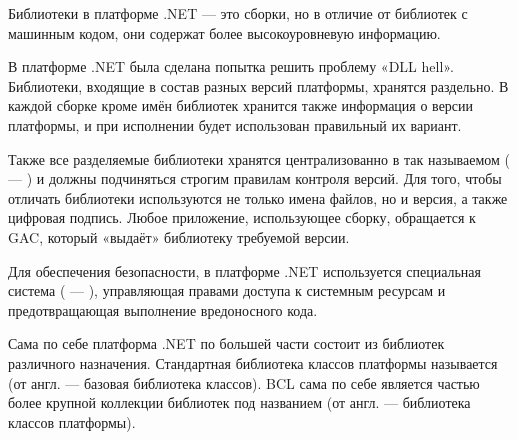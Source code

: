 Библиотеки в платформе .NET — это сборки, но в отличие от библиотек с
машинным кодом, они содержат более высокоуровневую информацию.

В платформе .NET была сделана попытка решить проблему «DLL
  hell». Библиотеки, входящие в состав разных версий платформы,
хранятся раздельно. В каждой сборке кроме имён библиотек хранится
также информация о версии платформы, и при исполнении будет
использован правильный их вариант.

Также все разделяемые библиотеки хранятся централизованно в так
называемом 
( — ) и должны подчиняться строгим правилам контроля версий. Для
того, чтобы отличать библиотеки используются не только имена файлов,
но и версия, а также цифровая подпись. Любое приложение, использующее
сборку, обращается к GAC, который «выдаёт» библиотеку требуемой
версии.

Для обеспечения безопасности, в платформе .NET используется
специальная система ( — ), управляющая правами доступа к
системным ресурсам и предотвращающая выполнение вредоносного кода.

Сама по себе платформа .NET по большей части состоит из библиотек
различного назначения. Стандартная библиотека классов платформы
называется  (от англ.  — базовая библиотека классов). BCL сама по себе
является частью более крупной коллекции библиотек под названием
 (от англ.  — библиотека классов платформы).

